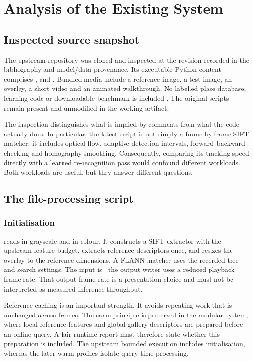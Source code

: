 \chapter{Analysis of the Existing System}\label{ch:existing}
\section{Inspected source snapshot}
The upstream repository was cloned and inspected at the revision recorded in the bibliography and model/data provenance. Its executable Python content comprises ,  and . Bundled media include a reference image, a test image, an overlay, a short video and an animated walkthrough. No labelled place database, learning code or downloadable benchmark is included \citep{stitchrepo}. The original scripts remain present and unmodified in the working artifact.

The inspection distinguishes what is implied by comments from what the code actually does. In particular, the latest script is not simply a frame-by-frame SIFT matcher: it includes optical flow, adaptive detection intervals, forward--backward checking and homography smoothing. Consequently, comparing its tracking speed directly with a learned re-recognition pass would confound different workloads. Both workloads are useful, but they answer different questions.

\section{The file-processing script}
\subsection{Initialisation}
 reads  in grayscale and  in colour. It constructs a SIFT extractor with the upstream feature budget, extracts reference descriptors once, and resizes the overlay to the reference dimensions. A FLANN matcher uses the recorded tree and search settings. The input is ; the output writer uses a reduced playback frame rate. That output frame rate is a presentation choice and must not be interpreted as measured inference throughput.

Reference caching is an important strength. It avoids repeating work that is unchanged across frames. The same principle is preserved in the modular system, where local reference features and global gallery descriptors are prepared before an online query. A fair runtime report must therefore state whether this preparation is included. The upstream bounded execution includes initialisation, whereas the later warm profiles isolate query-time processing.

